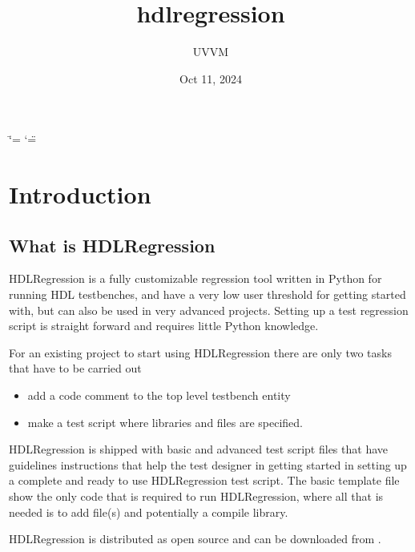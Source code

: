 \documentclass[letterpaper,10pt,english]{sphinxmanual}
\title{hdlregression}
\date{Oct 11, 2024}
\author{UVVM}
\begin{document}
\ifdefined\shorthandoff
  \ifnum\catcode`\=\string=\active\shorthandoff{=}\fi
  \ifnum\catcode`\"=\active{}\fi
\fi

\pagestyle{empty}
\sphinxmaketitle
\pagestyle{plain}
\sphinxtableofcontents
\pagestyle{normal}
\label{\detokenize{index::doc}}


\sphinxstepscope


\chapter{Introduction}
\label{\detokenize{intro:introduction}}\label{\detokenize{intro::doc}}

\section{What is HDLRegression}
\label{\detokenize{intro:what-is-hdlregression}}
\sphinxAtStartPar
HDLRegression is a fully customizable regression tool written in Python for running HDL testbenches, and have a
very low user threshold for getting started with, but can also be used in very advanced projects.
Setting up a test regression script is straight forward and requires little Python knowledge.

\sphinxAtStartPar
For an existing project to start using HDLRegression there are only two tasks that have to be carried out
\begin{itemize}
\item {} 
 \sphinxhyphen{} add a code comment to the top level testbench entity

\item {} 
 \sphinxhyphen{} make a test script where libraries and files are specified.

\end{itemize}

\sphinxAtStartPar
HDLRegression is shipped with basic and advanced test script {\hyperref[\detokenize{templates::doc}]{}} files that have guidelines instructions that help the
test designer in getting started in setting up a complete and ready to use HDLRegression test script.
The basic template file show the only code that is required to run HDLRegression, where all that is needed is to add file(s)
and potentially a compile library.

\sphinxAtStartPar
HDLRegression is distributed as open source and can be downloaded from .
\end{document}
